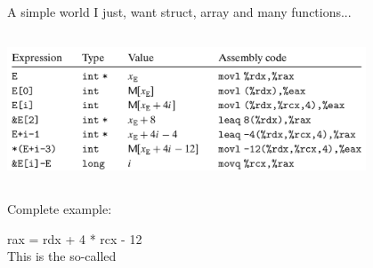 \documentclass[UKenglish]{beamer}
\begin{document}
\begin{frame}{A simple world}
  I just, want struct, array and many functions...
    \begin{center}
    \includegraphics[width = 0.8\textwidth, height=4.5cm]{addressing.png}
  \end{center}
  Complete example:
  \begin{center}
    rax = rdx + 4 * rcx - 12\\
   This is the so-called \color{red}{addressing mode}
  \end{center}
\end{frame}
\end{document}
